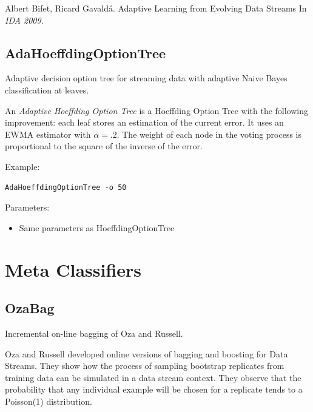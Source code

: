 \documentclass[a4paper,12pt,twoside]{book}
\begin{document}
 \begin{itemize}
Albert Bifet, Ricard Gavald\'a.
\newblock Adaptive Learning from Evolving Data Streams
\newblock In {\em IDA 2009}.
\end{itemize}


\subsection{AdaHoeffdingOptionTree}
Adaptive decision option tree for streaming data with adaptive Naive Bayes classification at leaves.

An {\em Adaptive Hoeffding Option Tree} is a Hoeffding Option Tree with the following improvement:
each leaf stores an estimation of the current error. It uses an EWMA
estimator with $\alpha =.2$.
The weight of each node in the voting process is 
proportional to the square of the inverse of the error.

Example:
\begin{footnotesize}\begin{verbatim}
AdaHoeffdingOptionTree -o 50
\end{verbatim}\end{footnotesize}

Parameters:
\begin{itemize}
\item Same parameters as HoeffdingOptionTree
\end{itemize}

\section{Meta Classifiers}




\subsection{OzaBag} Incremental on-line bagging of Oza and Russell.

Oza and Russell developed online versions %
of bagging and boosting for Data Streams. They show how the process
of sampling bootstrap replicates from training data can be simulated in a 
data stream context. 
They observe that the probability that any individual
example will be chosen for a replicate %
tends to a Poisson(1) distribution. 
\end{document}

